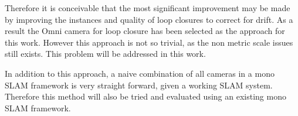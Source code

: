Therefore it is conceivable that the most significant improvement may be made by improving the instances and quality of loop closures to correct for drift.  As a result the Omni camera for loop closure has been selected as the approach for this work.  However this approach is not so trivial, as the non metric scale issues still exists.  This problem will be addressed in this work.

In addition to this approach, a naive combination of all cameras in a mono SLAM framework is very straight forward, given a working SLAM system.  Therefore this method will also be tried and evaluated using an existing mono SLAM framework.